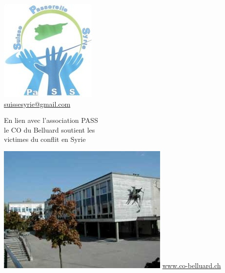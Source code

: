 \documentclass[frenchb,16pt,parskip=half-]{scrartcl}
\begin{document}
\begin{minipage}[b]{4cm}
	 \centering
    \includegraphics[width=\linewidth]{img/logopass.jpg}\\
	 {\tiny \url{suissesyrie@gmail.com}}
\end{minipage}\hfill
\begin{minipage}[b]{11cm}\centering\Large
    En lien avec l'association PASS\\
     le CO du Belluard soutient les\\ victimes du conflit en Syrie%
\end{minipage}\hfill
\begin{minipage}[b]{4cm}
	 \centering
    \includegraphics[width=\linewidth]{img/logobellu.png}
	 {\tiny \url{www.co-belluard.ch}}
\end{minipage}%
\end{document}
